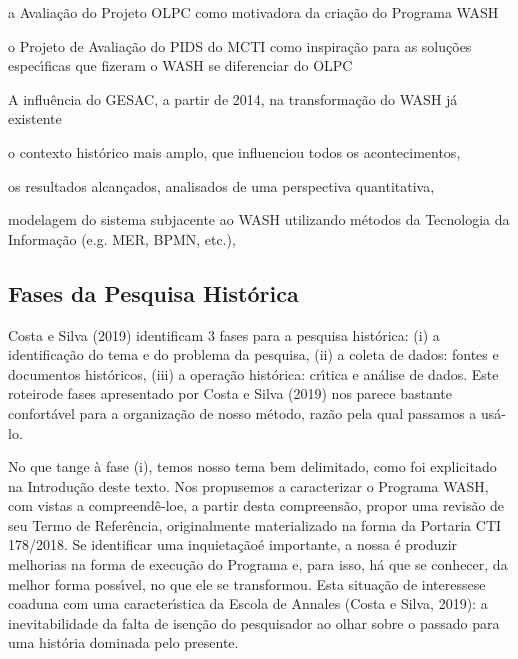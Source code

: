 \documentclass[
12pt,		%
openright,	%
twoside,  %
a4paper,			%
chapter=TITLE,		%
english,			%
french,				%
spanish,			%
brazil				%
]{USPSC-classe/USPSC}
\begin{document}
\begin{alineas}
\item a Avalia\c{c}\~ao do Projeto OLPC como motivadora da cria\c{c}\~ao do Programa WASH
\item o Projeto de Avalia\c{c}\~ao do PIDS do MCTI como inspira\c{c}\~ao para as solu\c{c}\~oes espec\'{\i}ficas que fizeram o WASH se diferenciar do OLPC
\item A influ\^encia do GESAC, a partir de 2014, na transforma\c{c}\~ao do WASH j\'a existente
\item o contexto hist\'orico mais amplo, que influenciou todos os acontecimentos,
\item os resultados alcan\c{c}ados, analisados de uma perspectiva quantitativa,
\item modelagem do sistema subjacente ao WASH utilizando m\'etodos da Tecnologia da Informa\c{c}\~ao (e.g. MER, BPMN, etc.),
\end{alineas}

\subsection[Fases da Pesquisa Hist\'orica]{Fases da Pesquisa Hist\'orica}\label{Fases da Pesquisa Hist\'orica}
 Costa e Silva (2019) identificam 3 fases para a pesquisa hist\'orica: (i) a identifica\c{c}\~ao do tema e do problema da pesquisa, (ii) a coleta de dados: fontes e documentos hist\'oricos, (iii) a opera\c{c}\~ao hist\'orica: cr\'{\i}tica e an\'alise de dados. Este \textquotedbl roteiro\textquotedbl  de fases apresentado por  Costa e Silva (2019) nos parece bastante confort\'avel para a organiza\c{c}\~ao de nosso m\'etodo, raz\~ao pela qual passamos a us\'a-lo.









No que tange \`a fase (i), temos nosso tema bem delimitado, como foi explicitado na Introdu\c{c}\~ao deste texto. Nos propusemos a caracterizar o Programa WASH, com vistas a \textquotedbl compreend\^e-lo\textquotedbl  e, a partir desta compreens\~ao, propor uma revis\~ao de seu Termo de Refer\^encia, originalmente materializado na forma da Portaria CTI 178/2018. Se \textquotedbl identificar uma inquieta\c{c}\~ao\textquotedbl  \'e importante, a nossa \'e produzir melhorias na forma de execu\c{c}\~ao do Programa e, para isso, h\'a que se conhecer, da melhor forma poss\'{\i}vel, no que ele se transformou. Esta situa\c{c}\~ao de \textquotedbl interesse\textquotedbl  se coaduna com uma caracter\'{\i}stica da Escola de Annales  (Costa e Silva, 2019): \textquotedbl a inevitabilidade da falta de isen\c{c}\~ao do pesquisador ao olhar sobre o passado para uma hist\'oria dominada pelo presente\textquotedbl .
\end{document}
